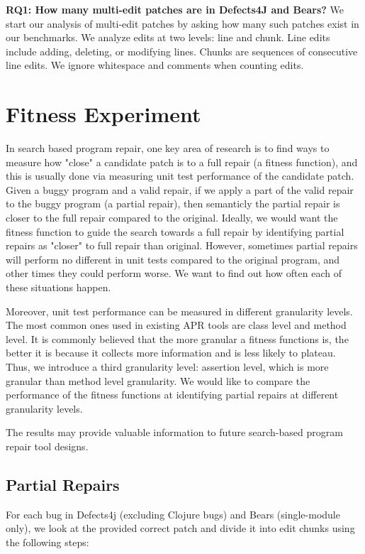 \documentclass[sigconf, timestamp-false, anonymous=true]{acmart}
\begin{document}
\textbf{RQ1: How many multi-edit patches are in Defects4J and Bears?}
We start our analysis of multi-edit patches by asking how many such patches 
exist in our benchmarks. We analyze edits at two levels: line and chunk.
Line edits include adding, deleting, or modifying lines.
Chunks are sequences of consecutive line edits.
We ignore whitespace and comments when counting edits.

\section{Fitness Experiment}

In search based program repair, one key area of research is to find ways to measure how "close" a candidate patch is to a full repair (a fitness function),
and this is usually done via measuring unit test performance of the candidate patch. 
Given a buggy program and a valid repair, if we apply a part of the valid repair to the buggy program (a partial repair), then semanticly the partial repair is closer to the full repair compared to the original. 
Ideally, we would want the fitness function to guide the search towards a full repair by identifying partial repairs as "closer" to full repair than original.
However, sometimes partial repairs will perform no different in unit tests compared to the original program, and other times they could perform worse. We want to find out how often each of these situations happen.

Moreover, unit test performance can be measured in different granularity levels. The most common ones used in existing APR tools are class level and method level. 
It is commonly believed that the more granular a fitness functions is, the better it is because it collects more information and is less likely to plateau. Thus, we introduce a third granularity level: assertion level, which is more granular than method level granularity.
We would like to compare the performance of the fitness functions at identifying partial repairs at different granularity levels.

The results may provide valuable information to future search-based program repair tool designs.

\subsection{Partial Repairs}

For each bug in Defects4j (excluding Clojure bugs) and Bears (single-module only), we look at the provided correct patch and divide it into edit chunks using the following steps:
\end{document}
